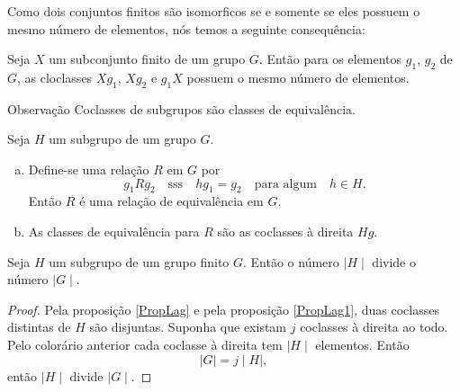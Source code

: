          Como dois conjuntos finitos são isomorficos se e somente se eles possuem o mesmo número de elementos, nós temos a seguinte consequência:
         \begin{corollary}
            Seja $X$ um subconjunto finito de um grupo $G$. Então para os elementos $g_{1}$, $g_{2}$ de $G$, as cloclasses $Xg_{1}$, $Xg_{2}$ e $g_{1}X$ possuem o mesmo número de elementos.
         \end{corollary}
         \begin{mymdframed}{Observação}
            Coclasses de subgrupos são classes de equivalência.
         \end{mymdframed}
         \begin{stat}\label{PropLag}
         Seja $H$ um subgrupo de um grupo $G$.
         \begin{enumerate}[a.]
            \item Define-se uma relação $R$ em $G$ por $$ g_{1} R g_{2}\quad \textrm{sss}\quad hg_{1} = g_{2}\quad \textrm{para\ algum}\quad h\in H.$$ Então $R$ é uma relação de equivalência em $G$.
            \item As classes de equivalência para $R$ são as coclasses à direita $Hg$.
         \end{enumerate}
         \end{stat}
         \begin{theorem}
         Seja $H$ um subgrupo de um grupo finito $G$. Então o número $\mid H\mid$ divide o número $\mid G\mid$.
         \begin{proof}
            Pela proposição \ref{PropLag} e pela proposição \ref{PropLag1}, duas coclasses distintas de $H$ são disjuntas. Suponha que existam $j$ coclasses à direita ao todo. Pelo colorário anterior cada coclasse à direita tem $\mid H \mid$ elementos. Então
            $$ \mid G\mid = j\mid H\mid,$$ então $\mid H \mid $ divide $\mid G \mid $.
         \end{proof}
         \end{theorem}

